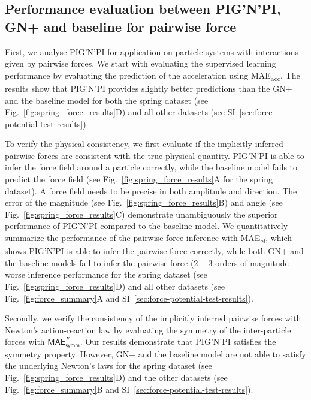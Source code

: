 \documentclass{article}
\newcommand{\pignpi}{PIG'N'PI\xspace}
\newcommand{\lemos}{GN+\xspace}
\newcommand{\APPENDIX}{SI} %
\begin{document}
\subsection{Performance evaluation between \pignpi{, \lemos} and baseline for pairwise force}
\label{sec:results_pignpi_vs_baseline_force}

First, we analyse \pignpi for application on particle systems with interactions given by pairwise forces. We start with evaluating the supervised learning performance by evaluating the prediction of the acceleration using \textsf{MAE\textsubscript{acc}}. The results show that \pignpi provides slightly better predictions than the {\lemos and the} baseline model for both the spring dataset (see Fig.~\ref{fig:spring_force_results}D) and all other datasets (see \APPENDIX~\ref{sec:force-potential-test-results}).
 
To verify the physical consistency, we first evaluate if the implicitly inferred pairwise forces are consistent with the true physical quantity. \pignpi is able to infer the  force field around a particle correctly, while the baseline model fails to predict the force field (see Fig.~\ref{fig:spring_force_results}A for the spring dataset). A force field needs to be precise in both amplitude and direction. The error of the magnitude (see Fig.~\ref{fig:spring_force_results}B) and angle (see Fig.~\ref{fig:spring_force_results}C) demonstrate unambiguously the superior performance of \pignpi compared to the baseline model. We quantitatively summarize the  performance of the pairwise force inference with \textsf{MAE\textsubscript{ef}}, which shows \pignpi is able to infer the pairwise force correctly, while both {\lemos and the} baseline models fail to infer the pairwise force ($2-3$ orders of magnitude worse inference performance for the spring dataset (see Fig.~\ref{fig:spring_force_results}D) and all other datasets (see Fig.~\ref{fig:force_summary}A and \APPENDIX~\ref{sec:force-potential-test-results}). 

Secondly, we verify the consistency of the implicitly inferred pairwise forces with  Newton's action-reaction law by evaluating the symmetry of the inter-particle forces with
$\textsf{MAE}_\textsf{symm}^{F}$. Our results demonstrate that \pignpi satisfies the symmetry property. However, {\lemos and the} baseline model are not able to satisfy the underlying Newton's laws for the spring dataset (see Fig.~\ref{fig:spring_force_results}D) and the other datasets (see Fig.~\ref{fig:force_summary}B and \APPENDIX~\ref{sec:force-potential-test-results}). 
\end{document}
